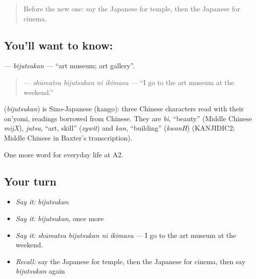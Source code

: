 \label{lesson:JA-C193-bijutsukan}



\begin{quote}
Before the new one: say the Japanese for temple, then the Japanese for cinema.
\end{quote}

\subsection*{You'll want to know: }
\textbf{} — \emph{bijutsukan} — \textquotedblleft{}art museum; art gallery\textquotedblright{}.

\begin{quote}
\textbf{  } — \emph{shūmatsu bijutsukan ni ikimasu} — \textquotedblleft{}I go to the art museum at the weekend.\textquotedblright{}
\end{quote}

\begin{cousinweb}
\textbf{} (\emph{bijutsukan}) is Sino-Japanese (kango): three Chinese characters read with their on'yomi, readings borrowed from Chinese. They are \emph{bi}, \textquotedblleft{}beauty\textquotedblright{} (Middle Chinese \emph{mijX}), \emph{jutsu}, \textquotedblleft{}art, skill\textquotedblright{} (\emph{zywit}) and \emph{kan}, \textquotedblleft{}building\textquotedblright{} (\emph{kwanH}) (KANJIDIC2; Middle Chinese in Baxter's transcription).
\end{cousinweb}

\begin{grammarlens}[title={What you've built}]
One more word for everyday life at A2.
\end{grammarlens}

\subsection*{Your turn}
\begin{itemize}
\raggedright
  \item \emph{Say it:} \emph{bijutsukan}
  \item \emph{Say it:} \emph{bijutsukan}, once more
  \item \emph{Say it:} \emph{shūmatsu bijutsukan ni ikimasu} — I go to the art museum at the weekend.
  \item \emph{Recall:} say the Japanese for temple, then the Japanese for cinema, then say \emph{bijutsukan} again
\end{itemize}

